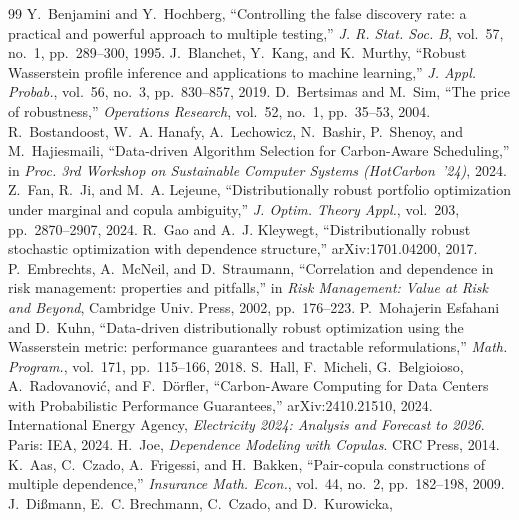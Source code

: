 \documentclass[12pt]{article}
\begin{document}
\renewcommand{\bibsection}{\section*{References}}
\begin{thebibliography}{99}\small
{} Y.~Benjamini and Y.~Hochberg, ``Controlling the false
discovery rate: a practical and powerful approach to multiple testing,'' \emph{J.
R. Stat. Soc. B}, vol.~57, no.~1, pp.~289--300, 1995.
 J.~Blanchet, Y.~Kang, and K.~Murthy, ``Robust Wasserstein
profile inference and applications to machine learning,'' \emph{J. Appl. Probab.},
vol.~56, no.~3, pp.~830--857, 2019.
 D.~Bertsimas and M.~Sim, ``The price of robustness,''
\emph{Operations Research}, vol.~52, no.~1, pp.~35--53, 2004.
 R.~Bostandoost, W.~A. Hanafy, A.~Lechowicz, N.~Bashir,
P.~Shenoy, and M.~Hajiesmaili, ``Data-driven Algorithm Selection for Carbon-Aware
Scheduling,'' in \emph{Proc. 3rd Workshop on Sustainable Computer Systems
(HotCarbon~'24)}, 2024.
 Z.~Fan, R.~Ji, and M.~A. Lejeune, ``Distributionally robust
portfolio optimization under marginal and copula ambiguity,'' \emph{J. Optim.
Theory Appl.}, vol.~203, pp.~2870--2907, 2024.
 R.~Gao and A.~J. Kleywegt, ``Distributionally robust stochastic
optimization with dependence structure,'' arXiv:1701.04200, 2017.
 P.~Embrechts, A.~McNeil, and D.~Straumann, ``Correlation
and dependence in risk management: properties and pitfalls,'' in \emph{Risk
Management: Value at Risk and Beyond}, Cambridge Univ. Press, 2002, pp.~176--223.
 P.~Mohajerin Esfahani and D.~Kuhn, ``Data-driven
distributionally robust optimization using the Wasserstein metric: performance
guarantees and tractable reformulations,'' \emph{Math. Program.}, vol.~171,
pp.~115--166, 2018.
 S.~Hall, F.~Micheli, G.~Belgioioso, A.~Radovanovi\'c, and
F.~D\"orfler, ``Carbon-Aware Computing for Data Centers with Probabilistic
Performance Guarantees,'' arXiv:2410.21510, 2024.
 International Energy Agency, \emph{Electricity 2024: Analysis and
Forecast to 2026}. Paris: IEA, 2024.
 H.~Joe, \emph{Dependence Modeling with Copulas}. CRC Press, 2014.
 K.~Aas, C.~Czado, A.~Frigessi, and H.~Bakken, ``Pair-copula
constructions of multiple dependence,'' \emph{Insurance Math. Econ.}, vol.~44,
no.~2, pp.~182--198, 2009.
 J.~Di\ss mann, E.~C. Brechmann, C.~Czado, and D.~Kurowicka,

\end{thebibliography}
\end{document}
